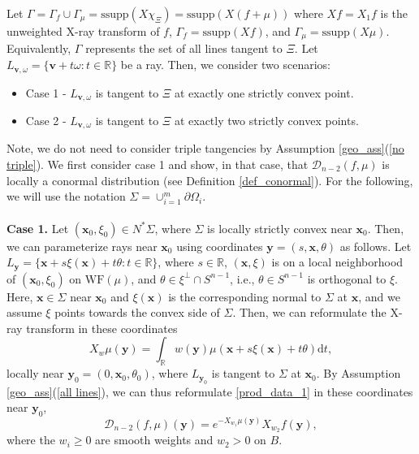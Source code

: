 \documentclass[a4paper,12pt]{amsart}
\numberwithin{equation}{section}
\theoremstyle{plain}
\numberwithin{theorem}{section}
\theoremstyle{definition}
\theoremstyle{remark}
\theoremstyle{remark}
\theoremstyle{remark}
\newcommand{\WF}{\mathrm{WF}}
\newcommand{\vv}{{\mathbf{v}}}
\newcommand{\vx}{{\mathbf{x}}}
\newcommand{\vy}{{\mathbf{y}}}
\begin{document}
Let $\Gamma = \Gamma_f \cup \Gamma_\mu = \text{ssupp}(X\chi_{\Xi}) = \text{ssupp}(X(f+\mu))$ where $Xf = X_1 f$ is the unweighted X-ray transform of $f$, $\Gamma_f = \text{ssupp}(Xf)$, and $\Gamma_\mu = \text{ssupp}(X\mu)$. Equivalently, $\Gamma$ represents the set of all lines tangent to $\Xi$. Let $L_{\vv,\omega} = \{\vv + t\omega : t\in \mathbb{R}\}$ be a ray. Then, we consider two scenarios:
\begin{itemize}
\item Case 1 - $L_{\vv,\omega}$ is tangent to $\Xi$ at exactly one strictly convex point.
\item Case 2 - $L_{\vv,\omega}$ is tangent to $\Xi$ at exactly two strictly convex points.
\end{itemize}
Note, we do not need to consider triple tangencies by Assumption \ref{geo_ass}(\ref{no triple}). We first consider case 1 and show, in that case, that $\mathcal{D}_{n-2}(f,\mu)$ is locally a conormal distribution (see Definition \ref{def_conormal}). For the following, we will use the notation  $\Sigma = \cup_{i=1}^m \partial \Omega_i$.\\
\\
\textbf{Case 1.} Let $(\vx_0,\xi_0) \in N^*\Sigma$, where $\Sigma$ is locally strictly convex near $\vx_0$. Then, we can parameterize rays near $\vx_0$ using coordinates $\vy = (s,\vx,\theta)$ as follows. Let $L_\vy = \{\vx + s\xi(\vx) + t\theta : t\in \mathbb{R}\}$, where $s\in \mathbb{R}$, $(\vx,\xi)$ is on a local neighborhood of $(\vx_0,\xi_0)$ on $\WF(\mu)$, and $\theta \in \xi^{\perp} \cap S^{n-1}$, i.e., $\theta \in S^{n-1}$ is orthogonal to $\xi$. Here, $\vx \in \Sigma$ near $\vx_0$ and $\xi(\vx)$ is the corresponding normal to $\Sigma$ at $\vx$, and we assume $\xi$ points towards the convex side of $\Sigma$. Then, we can reformulate the X-ray transform in these coordinates
\begin{equation}
X_w\mu(\vy) = \int_{\mathbb{R}} w(\vy) \mu(\vx + s\xi(\vx) + t\theta) \mathrm{d}t,
\end{equation}
locally near $\vy_0 = (0,\vx_0,\theta_0)$, where $L_{\vy_0}$ is tangent to $\Sigma$ at $\vx_0$. By Assumption \ref{geo_ass}(\ref{all lines}), we can thus reformulate \eqref{prod_data_1} in these coordinates near $\vy_0$,
\begin{equation}\label{prod_data_2}
\mathcal{D}_{n-2}(f,\mu)(\vy) = e^{ -X_{w_1}\mu(\vy) }  X_{w_2}f(\vy),
\end{equation}
where the $w_i \geq 0$ are smooth weights and $w_2 > 0$ on $B$.
\end{document}
